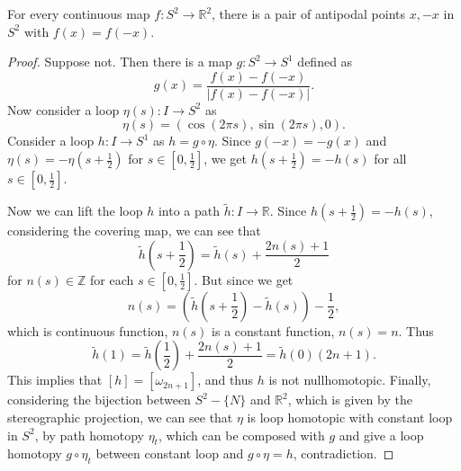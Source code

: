 \begin{thm} For every continuous map $f:S^2\rightarrow \mathbb{R}^2$, there is a pair of antipodal points $x,-x$ in $S^2$ with $f(x)=f(-x)$.
\end{thm}
\begin{proof}
Suppose not. Then there is a map $g:S^2\rightarrow S^1$ defined as
\begin{equation}
g(x)=\frac{f(x)-f(-x)}{|f(x)-f(-x)|}.
\end{equation}
Now consider a loop $\eta(s):I\rightarrow S^2$ as
\begin{equation}
\eta(s)=(\cos(2\pi s),\sin(2\pi s), 0).
\end{equation}
Consider a loop $h:I\rightarrow S^1$ as $h=g\circ \eta$. Since $g(-x)=-g(x)$ and $\eta(s)=-\eta(s+\frac{1}{2})$ for $s\in [0,\frac{1}{2}]$, we get $h(s+\frac{1}{2})=-h(s)$ for all $s\in [0,\frac{1}{2}]$.

Now we can lift the loop $h$ into a path $\tilde{h}:I\rightarrow \mathbb{R}$. Since $h(s+\frac{1}{2})=-h(s)$, considering the covering map, we can see that 
\begin{equation}
\tilde{h}\left(s+\frac{1}{2}\right)=\tilde{h}(s)+\frac{2n(s)+1}{2}
\end{equation}
for $n(s)\in \mathbb{Z}$ for each $s\in [0,\frac{1}{2}]$. But since we get
\begin{equation}
n(s)=\left(\tilde{h}\left(s+\frac{1}{2}\right)-\tilde{h}(s)\right)-\frac{1}{2},
\end{equation}
which is continuous function, $n(s)$ is a constant function, $n(s)=n$. Thus
\begin{equation}
\tilde{h}(1)=\tilde{h}\left(\frac{1}{2}\right)+\frac{2n(s)+1}{2}=\tilde{h}(0)(2n+1).
\end{equation}
This implies that $[h]=[\omega_{2n+1}]$, and thus $h$ is not nullhomotopic. Finally, considering the bijection between $S^2-\{N\}$ and $\mathbb{R}^2$, which is given by the stereographic projection, we can see that $\eta$ is loop homotopic with constant loop in $S^2$, by path homotopy $\eta_t$, which can be composed with $g$ and give a loop homotopy $g\circ \eta_t$ between constant loop and $g\circ \eta=h$, contradiction.
\end{proof}

